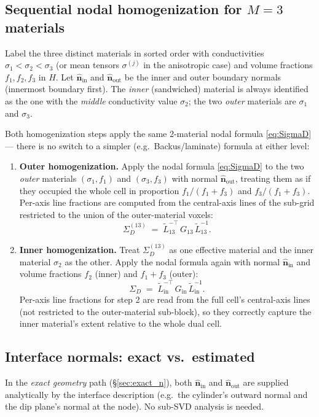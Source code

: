 \documentclass[11pt]{article}
\newcommand{\nn}{\hat{\bm{n}}}
\newcommand{\tL}{\widetilde{L}}
\newcommand{\SD}{\Sigma_D}
\begin{document}
\subsection*{Sequential nodal homogenization for $M = 3$ materials}

Label the three distinct materials in sorted order with conductivities
$\sigma_1 < \sigma_2 < \sigma_3$ (or mean tensors $\sigma^{(j)}$ in the
anisotropic case) and volume fractions $f_1, f_2, f_3$ in $H$.  Let
$\nn_\mathrm{in}$ and $\nn_\mathrm{out}$ be the inner and outer boundary
normals (innermost boundary first).  The \emph{inner} (sandwiched) material
is always identified as the one with the \emph{middle} conductivity value
$\sigma_2$; the two \emph{outer} materials are $\sigma_1$ and $\sigma_3$.

Both homogenization steps apply the same 2-material nodal formula
\eqref{eq:SigmaD} — there is no switch to a simpler (e.g.\ Backus/laminate)
formula at either level:

\begin{enumerate}
\item \textbf{Outer homogenization.}
Apply the nodal formula \eqref{eq:SigmaD} to the two
\emph{outer} materials $(\sigma_1, f_1)$ and $(\sigma_3, f_3)$ with
normal $\nn_\mathrm{out}$, treating them as if they occupied the whole cell
in proportion $f_1/(f_1+f_3)$ and $f_3/(f_1+f_3)$.  Per-axis line fractions
are computed from the central-axis lines of the sub-grid restricted to the
union of the outer-material voxels:
\[
  \SD^{(13)} \;=\; \tL_{13}^{-\top}\,G_{13}\,\tL_{13}^{-1}.
\]
\item \textbf{Inner homogenization.}
Treat $\SD^{(13)}$ as one effective material and the inner material $\sigma_2$
as the other.  Apply the nodal formula again with normal $\nn_\mathrm{in}$ and
volume fractions $f_2$ (inner) and $f_1+f_3$ (outer):
\[
  \SD \;=\; \tL_\mathrm{in}^{-\top}\,G_\mathrm{in}\,\tL_\mathrm{in}^{-1}.
\]
Per-axis line fractions for step 2 are read from the full cell's central-axis
lines (not restricted to the outer-material sub-block), so they correctly
capture the inner material's extent relative to the whole dual cell.
\end{enumerate}

\subsection*{Interface normals: exact vs.\ estimated}

In the \emph{exact geometry} path (\S\ref{sec:exact_n}), both $\nn_\mathrm{in}$
and $\nn_\mathrm{out}$ are supplied analytically by the interface description
(e.g.\ the cylinder's outward normal and the dip plane's normal at the node).
No sub-SVD analysis is needed.
\end{document}

